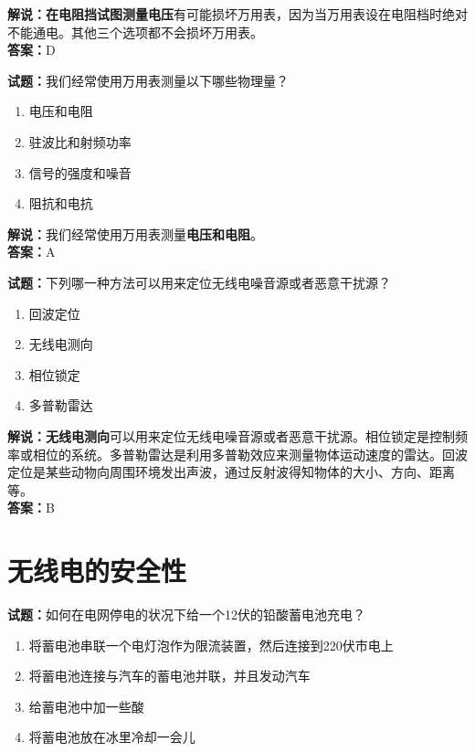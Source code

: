 \documentclass{ctexbook}
\begin{document}
\noindent\textbf{解说：在电阻挡试图测量电压}有可能损坏万用表，因为当万用表设在电阻档时绝对不能通电。其他三个选项都不会损坏万用表。\\\noindent\textbf{答案：}D


\bigskip


\noindent\textbf{试题：}我们经常使用万用表测量以下哪些物理量？

\begin{enumerate}[leftmargin=3em]
	\item 电压和电阻
	\item 驻波比和射频功率
	\item 信号的强度和噪音
	\item 阻抗和电抗
\end{enumerate}

\noindent\textbf{解说：}我们经常使用万用表测量\textbf{电压和电阻}。\\\noindent\textbf{答案：}A

\bigskip


\noindent\textbf{试题：}下列哪一种方法可以用来定位无线电噪音源或者恶意干扰源？

\begin{enumerate}[leftmargin=3em]
	\item 回波定位
	\item 无线电测向
	\item 相位锁定
	\item 多普勒雷达
\end{enumerate}

\noindent\textbf{解说：}\textbf{无线电测向}可以用来定位无线电噪音源或者恶意干扰源。相位锁定是控制频率或相位的系统。多普勒雷达是利用多普勒效应来测量物体运动速度的雷达。回波定位是某些动物向周围环境发出声波，通过反射波得知物体的大小、方向、距离等。\\\noindent\textbf{答案：}B%









\chapter{无线电的安全性}

\newpage

\noindent\textbf{试题：}如何在电网停电的状况下给一个12伏的铅酸蓄电池充电？

\begin{enumerate}[leftmargin=3em]	
	\item 将蓄电池串联一个电灯泡作为限流装置，然后连接到220伏市电上
	\item 将蓄电池连接与汽车的蓄电池并联，并且发动汽车
	\item 给蓄电池中加一些酸
	\item 将蓄电池放在冰里冷却一会儿
\end{enumerate}
\end{document}
